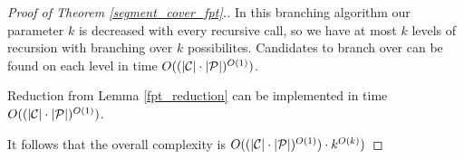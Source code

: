 \begin{proof}[Proof of Theorem \ref{segment_cover_fpt}.]
In this branching algorithm our parameter $k$ is decreased with every
recursive call, so we have at most $k$ levels of recursion with
branching over $k$ possibilites. Candidates to branch over
can be found on each level in time $O((|\mathcal{C}|\cdot|\mathcal{P}|)^{O(1)})$.

Reduction from Lemma \ref{fpt_reduction} can be implemented
in time $O((|\mathcal{C}|\cdot|\mathcal{P}|)^{O(1)})$.

It follows that the overall complexity
is $O((|\mathcal{C}|\cdot|\mathcal{P}|)^{O(1)}) \cdot k^{O(k)})$
\end{proof}

